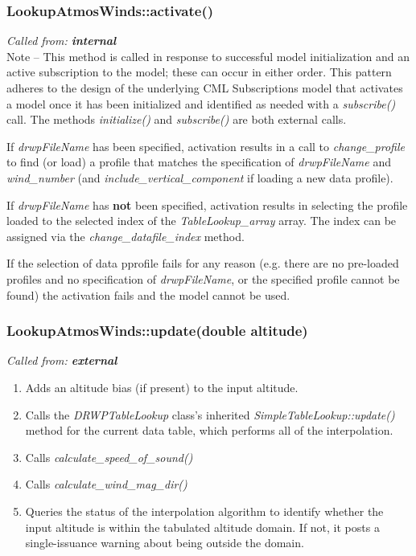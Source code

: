 \documentclass[11pt,fleqn]{report}
\begin{document}
\subsubsection{LookupAtmosWinds::activate()}
\textit{Called from: \textbf{internal}}\\
Note -- This method is called in response to successful model initialization
and an
active subscription to the model; these can occur in either order. This
pattern adheres to the design of the underlying CML Subscriptions model that
activates a model once it has been initialized and identified as needed with
a \textit{subscribe()} call. The methods
\textit{initialize()} and \textit{subscribe()} are both external calls.

If \textit{drwpFileName} has been specified, activation results in a call to
\textit{change\_profile} to find (or load) a profile that matches the
specification of \textit{drwpFileName} and \textit{wind\_number} (and
\textit{include\_vertical\_component} if loading a new data profile).

If \textit{drwpFileName} has \textbf{not} been specified, activation results
in selecting the profile loaded to the selected index of the
\textit{TableLookup\_array} array. The index can be assigned via the
\textit{change\_datafile\_index} method.

If the selection of data pprofile fails for any reason (e.g. there are no
pre-loaded profiles and no specification of \textit{drwpFileName}, or the
specified profile cannot be found) the activation fails and the model cannot
be used.


\subsubsection{LookupAtmosWinds::update(double altitude)}
\textit{Called from:  \textbf{external}}
\begin{enumerate}
\item Adds an altitude bias (if present) to the input altitude.
\item Calls the \textit{DRWPTableLookup} class's inherited
  \textit{SimpleTableLookup::update()} method for the current data table, which
  performs all of the interpolation.
\item Calls \textit{calculate\_speed\_of\_sound()}
\item Calls \textit{calculate\_wind\_mag\_dir()}
\item Queries the status of the interpolation algorithm to identify whether
  the input altitude is within the tabulated altitude domain. If not, it
  posts a single-issuance warning about being outside the domain.
\end{enumerate}
\end{document}

